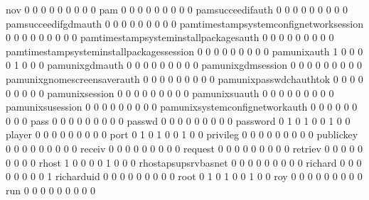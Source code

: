 \documentclass[compress,8pt]{beamer}
\begin{document}
\begin{frame}
\begin{Schunk}
  nov                                        0   0   0   0   0   0   0   0   0
  pam                                        0   0   0   0   0   0   0   0   0
  pamsucceedifauth                           0   0   0   0   0   0   0   0   0
  pamsucceedifgdmauth                        0   0   0   0   0   0   0   0   0
  pamtimestampsystemconfignetworksession     0   0   0   0   0   0   0   0   0
  pamtimestampsysteminstallpackagesauth      0   0   0   0   0   0   0   0   0
  pamtimestampsysteminstallpackagessession   0   0   0   0   0   0   0   0   0
  pamunixauth                                1   0   0   0   0   1   0   0   0
  pamunixgdmauth                             0   0   0   0   0   0   0   0   0
  pamunixgdmsession                          0   0   0   0   0   0   0   0   0
  pamunixgnomescreensaverauth                0   0   0   0   0   0   0   0   0
  pamunixpasswdchauthtok                     0   0   0   0   0   0   0   0   0
  pamunixsession                             0   0   0   0   0   0   0   0   0
  pamunixsuauth                              0   0   0   0   0   0   0   0   0
  pamunixsusession                           0   0   0   0   0   0   0   0   0
  pamunixsystemconfignetworkauth             0   0   0   0   0   0   0   0   0
  pass                                       0   0   0   0   0   0   0   0   0
  passwd                                     0   0   0   0   0   0   0   0   0
  password                                   0   1   0   1   0   0   1   0   0
  player                                     0   0   0   0   0   0   0   0   0
  port                                       0   1   0   1   0   0   1   0   0
  privileg                                   0   0   0   0   0   0   0   0   0
  publickey                                  0   0   0   0   0   0   0   0   0
  receiv                                     0   0   0   0   0   0   0   0   0
  request                                    0   0   0   0   0   0   0   0   0
  retriev                                    0   0   0   0   0   0   0   0   0
  rhost                                      1   0   0   0   0   1   0   0   0
  rhostapsupsrvbasnet                        0   0   0   0   0   0   0   0   0
  richard                                    0   0   0   0   0   0   0   0   1
  richarduid                                 0   0   0   0   0   0   0   0   0
  root                                       0   1   0   1   0   0   1   0   0
  roy                                        0   0   0   0   0   0   0   0   0
  run                                        0   0   0   0   0   0   0   0   0

\end{Schunk}
\end{frame}
\end{document}
